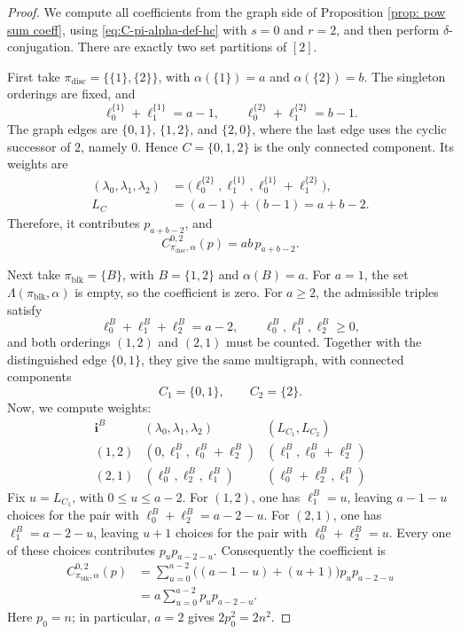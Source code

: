 \documentclass[11pt,reqno]{amsart}
\theoremstyle{definition}
\newcommand{\bfi}{\mathbf{i}}
\begin{document}
\begin{proof}
We compute all coefficients from the graph side of Proposition
\ref{prop: pow sum coeff}, using \eqref{eq:C-pi-alpha-def-hc} with
\(s=0\) and \(r=2\), and then perform \(\delta\)-conjugation.
There are exactly two set partitions of \([2]\).

First take \(\pi_{\mathrm{disc}}=\{\{1\},\{2\}\}\), with
\(\alpha(\{1\})=a\) and \(\alpha(\{2\})=b\).
The singleton orderings are fixed, and
\[
\ell_0^{\{1\}}+\ell_1^{\{1\}}=a-1,
\qquad
\ell_0^{\{2\}}+\ell_1^{\{2\}}=b-1.
\]
The graph edges are \(\{0,1\}\), \(\{1,2\}\), and \(\{2,0\}\),
where the last edge uses the cyclic successor of \(2\), namely \(0\).
Hence \(C=\{0,1,2\}\) is the only connected component. Its weights are
\[
\begin{aligned}
(\lambda_0,\lambda_1,\lambda_2)
&=\bigl(\ell_0^{\{2\}},\ell_1^{\{1\}},
\ell_0^{\{1\}}+\ell_1^{\{2\}}\bigr),\\
L_C&=(a-1)+(b-1)=a+b-2.
\end{aligned}
\]
Therefore,
it contributes
\(p_{a+b-2}\), and
\[
C_{\pi_{\mathrm{disc}},\alpha}^{0,2}(p)=ab\,p_{a+b-2}.
\]


Next take \(\pi_{\mathrm{blk}}=\{B\}\), with \(B=\{1,2\}\)
and \(\alpha(B)=a\). For \(a=1\), the set
\(\Lambda(\pi_{\mathrm{blk}},\alpha)\) is empty, so the coefficient
is zero. For \(a\geq2\), the admissible triples satisfy
\[
\ell_0^B+\ell_1^B+\ell_2^B=a-2,
\qquad \ell_0^B,\ell_1^B,\ell_2^B\geq0,
\]
and both orderings \((1,2)\) and \((2,1)\) must be counted.
Together with the distinguished edge \(\{0,1\}\), they give the
same multigraph, with connected components
\[
C_1=\{0,1\},\qquad C_2=\{2\}.
\]
Now, we compute weights:
\[
\begin{array}{c|c|c}
\bfi^B & (\lambda_0,\lambda_1,\lambda_2)&(L_{C_1},L_{C_2})\\ \hline
(1,2)&(0,\ell_1^B,\ell_0^B+\ell_2^B)
     &(\ell_1^B,\ell_0^B+\ell_2^B)\\
(2,1)&(\ell_0^B,\ell_2^B,\ell_1^B)
     &(\ell_0^B+\ell_2^B,\ell_1^B)
\end{array}
\]
Fix \(u=L_{C_1}\), with \(0\leq u\leq a-2\).
For \((1,2)\), one has \(\ell_1^B=u\), leaving
\(a-1-u\) choices for the pair with
\(\ell_0^B+\ell_2^B=a-2-u\).
For \((2,1)\), one has \(\ell_1^B=a-2-u\), leaving
\(u+1\) choices for the pair with \(\ell_0^B+\ell_2^B=u\).
Every one of these choices contributes \(p_u p_{a-2-u}\).
Consequently the coefficient is
\[
\begin{aligned}
C_{\pi_{\mathrm{blk}},\alpha}^{0,2}(p)
&=\sum_{u=0}^{a-2}\bigl((a-1-u)+(u+1)\bigr)p_u p_{a-2-u}\\
&=a\sum_{u=0}^{a-2}p_u p_{a-2-u}.
\end{aligned}
\]
Here \(p_0=n\); in particular, \(a=2\) gives \(2p_0^2=2n^2\).


\end{proof}
\end{document}
